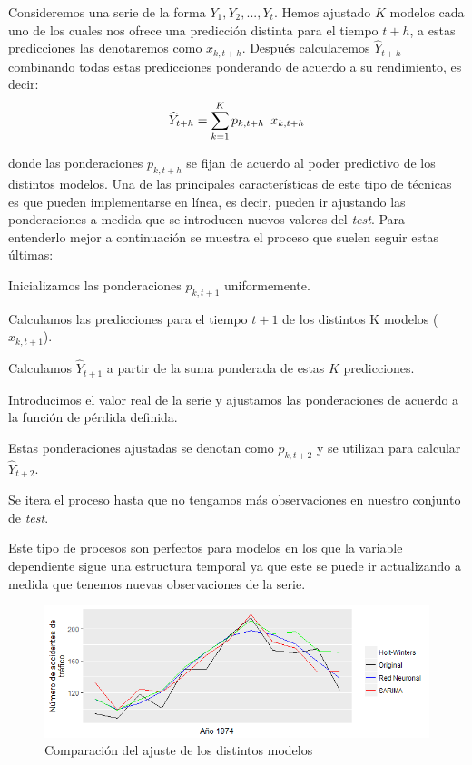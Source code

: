 Consideremos una serie de la forma $Y_1, Y_2,...,Y_t$. Hemos ajustado $K$ modelos cada uno de los cuales nos ofrece una predicción distinta para el tiempo $t+h$, a estas predicciones las denotaremos como $x_{k,t+h}$. Después calcularemos $\widehat{Y}_{t+h}$ combinando todas estas predicciones ponderando de acuerdo a su rendimiento, es decir:
\begin{equation}
    \widehat{Y}_{t+h} = \sum_{k = 1}^{K} p_{k,t+h} \enskip  x_{k,t+h}
\end{equation}

\noindent donde las ponderaciones $p_{k,t+h}$ se fijan de acuerdo al poder predictivo de los distintos modelos. Una de las principales características de este tipo de técnicas es que pueden implementarse en línea, es decir, pueden ir ajustando las ponderaciones a medida que se introducen nuevos valores del \textit{test}. Para entenderlo mejor a continuación se muestra el proceso que suelen seguir estas últimas:
\begin{enumerate*}
  \item Inicializamos las ponderaciones $p_{k,t+1}$ uniformemente.
  \item Calculamos las predicciones para el tiempo $t+1$ de los distintos K modelos ($x_{k,t+1}$).
  \item Calculamos $\widehat{Y}_{t+1}$ a partir de la suma ponderada de estas $K$ predicciones.
  \item Introducimos el valor real de la serie y ajustamos las ponderaciones de acuerdo a la función de pérdida definida.
  \item Estas ponderaciones ajustadas se denotan como $p_{k,t+2}$ y se utilizan para calcular $\widehat{Y}_{t+2}$.
  \item Se itera el proceso hasta que no tengamos más observaciones en nuestro conjunto de \textit{test}.
\end{enumerate*}

Este tipo de procesos son perfectos para modelos en los que la variable dependiente sigue una estructura temporal ya que este se puede ir actualizando a medida que tenemos nuevas observaciones de la serie.
\begin{figure}
    \centering
    \centerline{\includegraphics[scale = 0.7]{Images/Modelizacion/332.png}}
    \caption{Comparación del ajuste de los distintos modelos}
    \label{comp_entre_modelos}
\end{figure}

